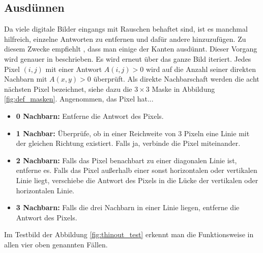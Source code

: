 \documentclass[a4paper, 11pt]{report}
\theoremstyle{definition}
\begin{document}
		\subsection{Ausdünnen}\label{ssec:thinout}
			Da viele digitale Bilder eingangs mit Rauschen behaftet sind, ist es manchmal hilfreich, einzelne Antworten zu entfernen und dafür andere hinzuzufügen. Zu diesem Zwecke empfiehlt \cite{SUSAN}, dass man einige der Kanten ausdünnt. Dieser Vorgang wird genauer in \cite{thinout} beschrieben.
			Es wird erneut über das ganze Bild iteriert. Jedes Pixel $(i,j)$ mit einer Antwort $A(i,j) > 0$ wird auf die Anzahl seiner direkten Nachbarn mit $A(x,y) > 0$ überprüft. Als direkte Nachbarschaft werden die acht nächsten Pixel bezeichnet, siehe dazu die $3\times 3$ Maske in Abbildung \ref{fig:def_masken}. Angenommen, das Pixel hat...
			\begin{itemize}
				\item \textbf{0 Nachbarn:}
					Entferne die Antwort des Pixels.
				\item \textbf{1 Nachbar:}
					Überprüfe, ob in einer Reichweite von 3 Pixeln eine Linie mit der gleichen Richtung existiert. Falls ja, verbinde die Pixel miteinander.
				\item \textbf{2 Nachbarn:}
					Falls das Pixel benachbart zu einer diagonalen Linie ist, entferne es.
					Falls das Pixel außerhalb einer sonst horizontalen oder vertikalen Linie liegt, verschiebe die Antwort des Pixels in die Lücke der vertikalen oder horizontalen Linie.
				\item \textbf{3 Nachbarn:}
					Falls die drei Nachbarn in einer Linie liegen, entferne die Antwort des Pixels.
			\end{itemize}

			Im Testbild der Abbildung \ref{fig:thinout_test} erkennt man die Funktionsweise in allen vier oben genannten Fällen.
\end{document}
